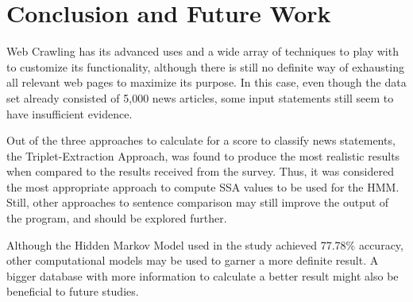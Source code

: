 \documentclass[journal]{./IEEEtran}
\begin{document}
	\section{Conclusion and Future Work}
	Web Crawling has its advanced uses and a wide array of techniques to play with to customize its functionality, although there is still no definite way of exhausting all relevant web pages to maximize its purpose. In this case, even though the data set already consisted of 5,000 news articles, some input statements still seem to have insufficient evidence.
	
	Out of the three approaches to calculate for a score to classify news statements, the Triplet-Extraction Approach, was found to produce the most realistic results when compared to the results received from the survey. Thus, it was considered the most appropriate approach to compute SSA values to be used for the HMM. Still, other approaches to sentence comparison may still improve the output of the program, and should be explored further.
	
	Although the Hidden Markov Model used in the study achieved 77.78\% accuracy, other computational models may be used to garner a more definite result. A bigger database with more information to calculate a better result might also be beneficial to future studies.
	
	
	
	
	
	
    \appendices
    
\end{document}

